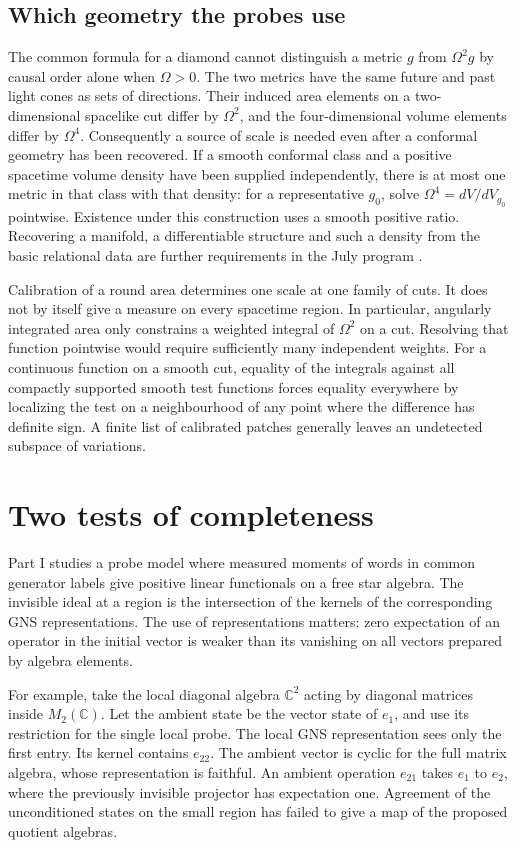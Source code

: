 \documentclass[11pt,letterpaper]{article}
\begin{document}
\subsection{Which geometry the probes use}
The common formula for a diamond cannot distinguish a metric \(g\) from
\(\Omega^2g\) by causal order alone when \(\Omega>0\).
The two metrics have the same future and past light cones as sets of
directions. Their induced area elements on a two-dimensional spacelike
cut differ by \(\Omega^2\), and the four-dimensional volume elements differ
by \(\Omega^4\). Consequently a source of scale is needed even after
a conformal geometry has been recovered. If a smooth conformal class
and a positive spacetime volume density have been supplied independently,
there is at most one metric in that class with that density: for a
representative \(g_0\), solve
\(\Omega^4=dV/dV_{g_0}\) pointwise. Existence under this construction
uses a smooth positive ratio. Recovering a manifold, a differentiable
structure and such a density from the basic relational data are further
requirements in the July program \cite{cond}.

Calibration of a round area determines one scale at one family of
cuts. It does not by itself give a measure on every spacetime region.
In particular, angularly integrated area only constrains a weighted
integral of \(\Omega^2\) on a cut. Resolving that function pointwise
would require sufficiently many independent weights. For a continuous
function on a smooth cut, equality of the integrals against all compactly
supported smooth test functions forces equality everywhere by localizing
the test on a neighbourhood of any point where the difference has
definite sign. A finite list of calibrated patches generally leaves
an undetected subspace of variations.

\section{Two tests of completeness}
Part I studies a probe model where measured moments of words in common generator labels give positive linear functionals on a free star algebra. The invisible ideal at a region is the intersection of the kernels of the corresponding GNS representations. The use of representations matters: zero expectation of an operator in the initial vector is weaker than its vanishing on all vectors prepared by algebra elements.

For example, take the local diagonal algebra $\mathbb C^2$ acting by diagonal matrices inside $M_2(\mathbb C)$. Let the ambient state be the vector state of $e_1$, and use its restriction for the single local probe. The local GNS representation sees only the first entry. Its kernel contains $e_{22}$. The ambient vector is cyclic for the full matrix algebra, whose representation is faithful. An ambient operation $e_{21}$ takes $e_1$ to $e_2$, where the previously invisible projector has expectation one. Agreement of the unconditioned states on the small region has failed to give a map of the proposed quotient algebras.
\end{document}
